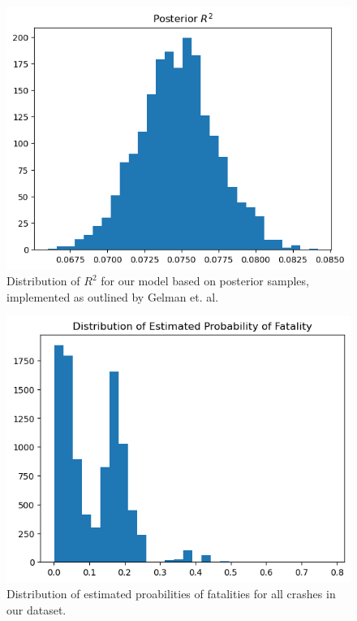 \documentclass[12pt]{article}
\begin{document}
\begin{figure}[h]
    \centering
    \includegraphics[width=\textwidth]{images/R2_dist.png}
    \caption{Distribution of $R^2$ for our model based on posterior samples, implemented as outlined by Gelman et. al.}
    \label{fig:r2_dist}
\end{figure}

\begin{figure}[h]
    \centering
    \includegraphics[width=\textwidth]{images/prob_dist.png}
    \caption{Distribution of estimated proabilities of fatalities for all crashes in our dataset.}
    \label{fig:prob_dist}
\end{figure}



\clearpage

\printbibliography
\end{document}

